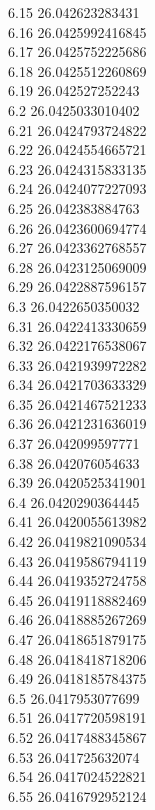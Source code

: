 {6.15	26.042623283431\\
6.16	26.0425992416845\\
6.17	26.0425752225686\\
6.18	26.0425512260869\\
6.19	26.042527252243\\
6.2	26.0425033010402\\
6.21	26.0424793724822\\
6.22	26.0424554665721\\
6.23	26.0424315833135\\
6.24	26.0424077227093\\
6.25	26.042383884763\\
6.26	26.0423600694774\\
6.27	26.0423362768557\\
6.28	26.0423125069009\\
6.29	26.0422887596157\\
6.3	26.0422650350032\\
6.31	26.0422413330659\\
6.32	26.0422176538067\\
6.33	26.0421939972282\\
6.34	26.0421703633329\\
6.35	26.0421467521233\\
6.36	26.0421231636019\\
6.37	26.042099597771\\
6.38	26.042076054633\\
6.39	26.0420525341901\\
6.4	26.0420290364445\\
6.41	26.0420055613982\\
6.42	26.0419821090534\\
6.43	26.0419586794119\\
6.44	26.0419352724758\\
6.45	26.0419118882469\\
6.46	26.0418885267269\\
6.47	26.0418651879175\\
6.48	26.0418418718206\\
6.49	26.0418185784375\\
6.5	26.0417953077699\\
6.51	26.0417720598191\\
6.52	26.0417488345867\\
6.53	26.041725632074\\
6.54	26.0417024522821\\
6.55	26.0416792952124\\
}
